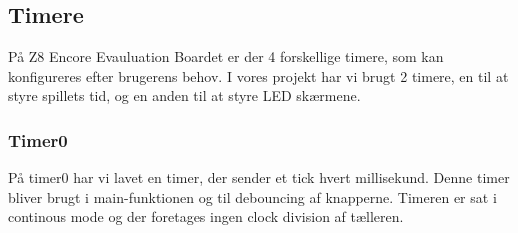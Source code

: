 \subsection{Timere}
På Z8 Encore Evauluation Boardet er der 4 forskellige timere, som kan konfigureres efter brugerens behov. I vores projekt har vi brugt 2 timere, en til at styre spillets tid, og en anden til at styre LED skærmene.
\subsubsection{Timer0}
På timer0 har vi lavet en timer, der sender et tick hvert millisekund. Denne timer bliver brugt i main-funktionen og til debouncing af knapperne. Timeren er sat i continous mode og der foretages ingen clock division af tælleren. 

  